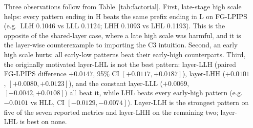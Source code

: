 \documentclass[times,twocolumn,final]{elsarticle}
\begin{document}
\begin{table}[t]
\centering
\caption{Complete binary layer-wise temporal-pattern ablation on 24 probe
objects and three seeds (development ablation; shared inputs per
object--seed). FG-LPIPS is the selection metric; lower is better. Patterns
with an early-high component are dominated on fidelity metrics.}
\label{tab:factorial}
\scriptsize
{}
\end{table}

Three observations follow from Table~\ref{tab:factorial}. First, late-stage
high scale helps: every pattern ending in H beats the same prefix ending in L
on FG-LPIPS (e.g.\ LLH 0.1046 vs LLL 0.1124; LHH 0.1093 vs LHL 0.1193). This
is the opposite of the shared-layer case, where a late high scale was harmful,
and it is the layer-wise counterexample to importing the C3 intuition.
Second, an early high scale hurts: all early-low patterns beat their
early-high counterparts. Third, the originally motivated layer-LHL is not the
best pattern: layer-LLH (paired FG-LPIPS difference $+0.0147$, 95\% CI
$[+0.0117,+0.0187]$), layer-LHH ($+0.0101$, $[+0.0080,+0.0123]$), and the
constant layer-LLL ($+0.0069$, $[+0.0042,+0.0108]$) all beat it, while LHL
beats every early-high pattern (e.g.\ $-0.0101$ vs HLL, CI
$[-0.0129,-0.0074]$). Layer-LLH is the strongest pattern on five of the seven
reported metrics and layer-LHH on the remaining two; layer-LHL is best on
none.
\end{document}
